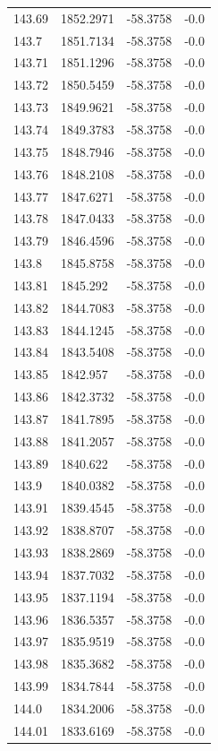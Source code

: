 \begin{table}[H]
\begin{tabular}{llll}
143.69 & 1852.2971 & -58.3758 & -0.0 \\
143.7 & 1851.7134 & -58.3758 & -0.0 \\
143.71 & 1851.1296 & -58.3758 & -0.0 \\
143.72 & 1850.5459 & -58.3758 & -0.0 \\
143.73 & 1849.9621 & -58.3758 & -0.0 \\
143.74 & 1849.3783 & -58.3758 & -0.0 \\
143.75 & 1848.7946 & -58.3758 & -0.0 \\
143.76 & 1848.2108 & -58.3758 & -0.0 \\
143.77 & 1847.6271 & -58.3758 & -0.0 \\
143.78 & 1847.0433 & -58.3758 & -0.0 \\
143.79 & 1846.4596 & -58.3758 & -0.0 \\
143.8 & 1845.8758 & -58.3758 & -0.0 \\
143.81 & 1845.292 & -58.3758 & -0.0 \\
143.82 & 1844.7083 & -58.3758 & -0.0 \\
143.83 & 1844.1245 & -58.3758 & -0.0 \\
143.84 & 1843.5408 & -58.3758 & -0.0 \\
143.85 & 1842.957 & -58.3758 & -0.0 \\
143.86 & 1842.3732 & -58.3758 & -0.0 \\
143.87 & 1841.7895 & -58.3758 & -0.0 \\
143.88 & 1841.2057 & -58.3758 & -0.0 \\
143.89 & 1840.622 & -58.3758 & -0.0 \\
143.9 & 1840.0382 & -58.3758 & -0.0 \\
143.91 & 1839.4545 & -58.3758 & -0.0 \\
143.92 & 1838.8707 & -58.3758 & -0.0 \\
143.93 & 1838.2869 & -58.3758 & -0.0 \\
143.94 & 1837.7032 & -58.3758 & -0.0 \\
143.95 & 1837.1194 & -58.3758 & -0.0 \\
143.96 & 1836.5357 & -58.3758 & -0.0 \\
143.97 & 1835.9519 & -58.3758 & -0.0 \\
143.98 & 1835.3682 & -58.3758 & -0.0 \\
143.99 & 1834.7844 & -58.3758 & -0.0 \\
144.0 & 1834.2006 & -58.3758 & -0.0 \\
144.01 & 1833.6169 & -58.3758 & -0.0 \\

\end{tabular}
\end{table}
